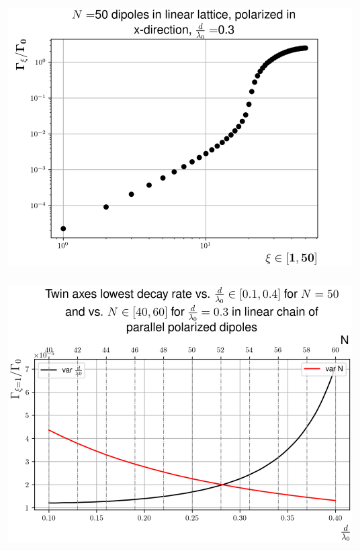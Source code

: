 \documentclass{article}
\begin{document}
\begin{figure}[H]
    \begin{subfigure}{0.49\textwidth}
        \includegraphics[width=\textwidth]{figs/case_linear_parallel_d_03.png}
        \caption{}
        \label{fig:linear_chain_decayrates}
    \end{subfigure}
    \hfill
    \begin{subfigure}{0.49\textwidth}
        \includegraphics[width=\textwidth]{figs/case_linear_parallel_var_distance_01_04_var_N_40_60_lowest.png}
        \caption{}
        \label{fig:linear_chain_decayrates_var_dist_N}
    \end{subfigure}

\end{figure}
\end{document}
